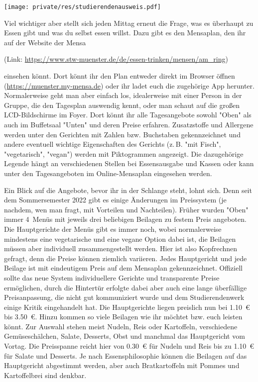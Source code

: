 \begin{multicols}{2}
 \begin{center}
 	\texttt{[image: private/res/studierendenausweis.pdf]}
 \end{center}

Viel wichtiger aber stellt sich jeden Mittag erneut die Frage, was es überhaupt zu Essen gibt und was du selbst essen willst.
Dazu gibt es den Mensaplan, den ihr auf der Website der Mensa

\begin{center}
	(Link:
	\url{https://www.stw-muenster.de/de/essen-trinken/mensen/am_ring})
\end{center}

einsehen könnt. Dort könnt ihr den Plan entweder direkt im Browser öffnen (\url{https://muenster.my-mensa.de}) oder ihr ladet euch die zugehörige App herunter. Normalerweise geht man aber einfach los, idealerweise mit einer Person in der Gruppe, die den Tagesplan auswendig kennt, oder man schaut auf die
großen LCD-Bildschirme im Foyer. Dort könnt ihr alle Tagesangebote sowohl "Oben" als auch im Buffetsaal "Unten" und deren Preise erfahren. Zusatzstoffe und Allergene werden unter den Gerichten mit Zahlen bzw. Buchstaben gekennzeichnet und andere eventuell wichtige Eigenschaften des Gerichts (z.\,B. "mit Fisch", "vegetarisch", "vegan") werden mit Piktogrammen angezeigt. Die dazugehörige Legende hängt an verschiedenen Stellen bei Essensausgabe und Kassen oder kann unter den Tagesangeboten im Online-Mensaplan eingesehen werden.

Ein Blick auf die Angebote, bevor ihr in der Schlange steht, lohnt sich. Denn seit dem Sommersemester 2022 gibt es einige Änderungen im Preissystem (je nachdem, wen man fragt, mit Vorteilen und Nachteilen). Früher wurden "Oben" immer 4~Menüs mit jeweils drei beliebigen Beilagen zu festem Preis angeboten. Die Hauptgerichte der Menüs gibt es immer noch, wobei normalerweise mindestens eine vegetarische und eine vegane Option dabei ist, die Beilagen müssen aber individuell zusammengestellt werden. Hier ist also Kopfrechnen gefragt, denn die Preise können ziemlich variieren. Jedes Hauptgericht und jede Beilage ist mit eindeutigem Preis auf dem Mensaplan gekennzeichnet. Offiziell sollte das neue System individuellere Gerichte und transparente Preise ermöglichen, durch die Hintertür erfolgte dabei aber auch eine lange überfällige Preisanpassung, die nicht gut kommuniziert wurde und dem Studierendenwerk einige Kritik eingehandelt hat.
Die Hauptgerichte liegen preislich nun bei \SI{1,10}{\euro} bis \SI{3,50}{\euro}. Hinzu kommen so viele Beilagen wie ihr möchtet bzw. euch leisten könnt. Zur Auswahl stehen meist Nudeln, Reis oder Kartoffeln, verschiedene Gemüseschälchen, Salate, Desserts, Obst und manchmal das Hauptgericht vom Vortag. Die Preisspanne reicht hier von \SI{0,30}{\euro} für Nudeln und Reis bis zu \SI{1,10}{\euro} für Salate und Desserts. Je nach Essensphilosophie können die Beilagen auf das Hauptgericht abgestimmt werden, aber auch Bratkartoffeln mit Pommes und Kartoffelbrei sind denkbar.


\end{multicols}
